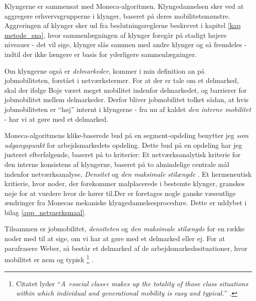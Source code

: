 
Klyngerne er sammensat med Moneca-algoritmen. Klyngedannelsen sker ved at aggregere erhvervsgrupperne i klynger, baseret på deres mobilitetsmønstre. Aggreringen af klynger sker ud fra beslutningsreglerne beskrevet i kapitel \ref{kap metode_sna}, hvor sammenlægningen af klynger foregår på stadigt højere niveauer - det vil sige, klynger slås sammen med andre klynger og så fremdeles - indtil der ikke længere er basis for yderligere sammenlægninger. 

Om klyngerne også er \emph{delmarkeder}, kommer i min definition an på jobmobiliteten, forstået i netværkstermer. For at der er tale om et delmarked, skal der ifølge Boje været meget mobilitet indenfor delmarkedet, og barrierer for jobmobilitet mellem  delmarkeder. Derfor bliver jobmobilitet tolket sådan, at hvis jobmobiliteten er “høj” internt i klyngerne - fra nu af kaldet \emph{den interne mobilitet} - har vi at gøre med et delmarked. 

Moneca-algoritmens klike-baserede bud på en segment-opdeling benytter jeg \emph{som udgangspunkt} for arbejdsmarkedets opdeling. Dette bud på en opdeling har jeg justeret efterfølgende, baseret på to kriterier: Et netværksanalytisk kriterie for den interne konsistens af klyngerne, baseret på to almindelige centrale mål indenfor netværksanalyse,   \emph{Densitet} og \emph{den maksimale stilængde} \parencite[68f]{Scott2000}. Et hermeneutisk kritierie, hvor noder, der forekommer malplacerede i bestemte klynger, granskes nøje for at vurdere hvor de hører til.Der er foretages nogle ganske væsentlige ændringer fra Monecas mekaniske klyngedannelsesprocedure. Dette er uddybet i bilag \ref{app_netvaerksmaal}.  

Tilsammen er jobmobilitet, \emph{densiteten} og \emph{den maksimale stilængde} for en række noder med til at sige, om vi har at gøre med et delmarked eller ej. For at parafrasere Weber, så består et delmarked af de arbejdsmarkedssituationer, hvor mobilitet er nem og typisk 
%
\footnote{Citatet lyder “\emph{A »social class« makes up the totality of those class situations within which individual and generational mobility is easy and typical.}” \parencite[302]{Weber1978}.}%
%
\parencite[302]{Weber1978}. 

